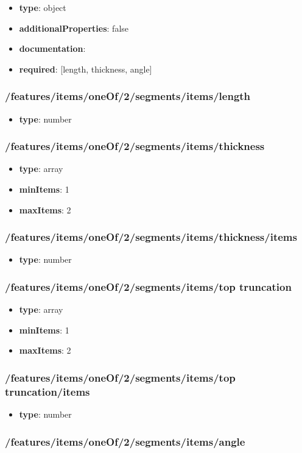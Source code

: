 \begin{itemize}\item {\bf type}: object
\item {\bf additionalProperties}: false
\item {\bf documentation}: 
\item {\bf required}: [length, thickness, angle]\end{itemize}
\subsubsection{/features/items/oneOf/2/segments/items/length}
\begin{itemize}\item {\bf type}: number
\end{itemize}\subsubsection{/features/items/oneOf/2/segments/items/thickness}
\begin{itemize}\item {\bf type}: array
\item {\bf minItems}: 1
\item {\bf maxItems}: 2
\end{itemize}\subsubsection{/features/items/oneOf/2/segments/items/thickness/items}
\begin{itemize}\item {\bf type}: number
\end{itemize}\subsubsection{/features/items/oneOf/2/segments/items/top truncation}
\begin{itemize}\item {\bf type}: array
\item {\bf minItems}: 1
\item {\bf maxItems}: 2
\end{itemize}\subsubsection{/features/items/oneOf/2/segments/items/top truncation/items}
\begin{itemize}\item {\bf type}: number
\end{itemize}\subsubsection{/features/items/oneOf/2/segments/items/angle}
